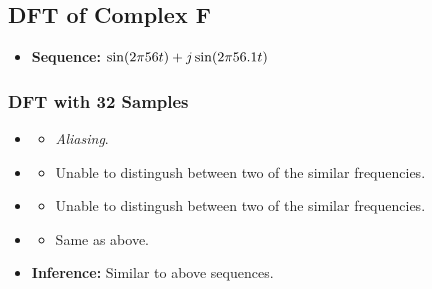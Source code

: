 \documentclass[../../course]{subfiles}
\begin{document}
\pagebreak

\subsection{DFT of Complex F} \label{ssec:dtftCplxF}

\begin{itemize} [label=]

    \item \textbf{Sequence:} $\sin(2 \pi 56 t) + j \sin(2 \pi 56.1 t)$

\end{itemize}

\subsubsection{DFT with 32 Samples}

\begin{itemize} [label=]

    \item \sampFreqMuchLess
        \begin{itemize} [label=]
            \item \emph{Aliasing}.
        \end{itemize}

    \item \sampFreqNorm
        \begin{itemize} [label=]
            \item Unable to distingush between two of the similar frequencies.
        \end{itemize}

    \item \sampFreqSligGreat
        \begin{itemize} [label=]
            \item Unable to distingush between two of the similar frequencies.
        \end{itemize}

    \item \sampFreqMuchGreat
        \begin{itemize} [label=]
            \item Same as above.
        \end{itemize}

    \item \textbf{Inference:} Similar to above sequences.

\end{itemize}
\end{document}
